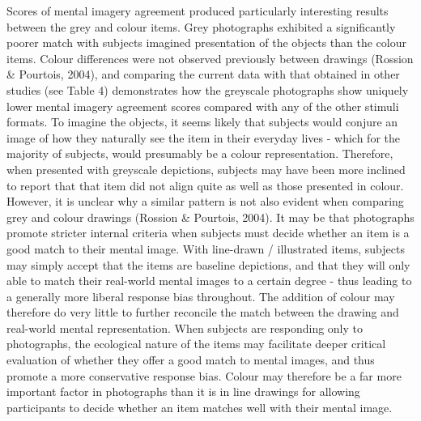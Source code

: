 \documentclass[
  11pt,
]{article}
\begin{document}
Scores of mental imagery agreement produced particularly interesting
results between the grey and colour items. Grey photographs exhibited a
significantly poorer match with subjects imagined presentation of the
objects than the colour items. Colour differences were not observed
previously between drawings (Rossion \& Pourtois, 2004), and comparing
the current data with that obtained in other studies (see Table 4)
demonstrates how the greyscale photographs show uniquely lower mental
imagery agreement scores compared with any of the other stimuli formats.
To imagine the objects, it seems likely that subjects would conjure an
image of how they naturally see the item in their everyday lives - which
for the majority of subjects, would presumably be a colour
representation. Therefore, when presented with greyscale depictions,
subjects may have been more inclined to report that that item did not
align quite as well as those presented in colour. However, it is unclear
why a similar pattern is not also evident when comparing grey and colour
drawings (Rossion \& Pourtois, 2004). It may be that photographs promote
stricter internal criteria when subjects must decide whether an item is
a good match to their mental image. With line-drawn / illustrated items,
subjects may simply accept that the items are baseline depictions, and
that they will only able to match their real-world mental images to a
certain degree - thus leading to a generally more liberal response bias
throughout. The addition of colour may therefore do very little to
further reconcile the match between the drawing and real-world mental
representation. When subjects are responding only to photographs, the
ecological nature of the items may facilitate deeper critical evaluation
of whether they offer a good match to mental images, and thus promote a
more conservative response bias. Colour may therefore be a far more
important factor in photographs than it is in line drawings for allowing
participants to decide whether an item matches well with their mental
image.
\end{document}
